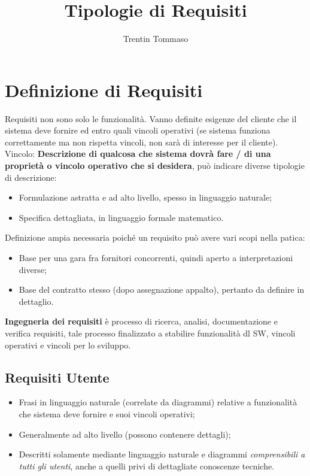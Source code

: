 \documentclass{article}
\title{Tipologie di Requisiti}
\author{Trentin Tommaso}
\begin{document}
  \maketitle
  \tableofcontents
  \newpage
  \section{Definizione di Requisiti}
    Requisiti non sono solo le funzionalità. Vanno definite esigenze del cliente che il sistema deve fornire ed entro quali vincoli operativi (se sistema funziona correttamente ma non rispetta vincoli, non sarà di interesse per il cliente). \\
    Vincolo: \textbf{Descrizione di qualcosa che sistema dovrà fare / di una proprietà o vincolo operativo che si desidera}, può indicare diverse tipologie di descrizione:
    \begin{itemize}
      \item Formulazione astratta e ad alto livello, spesso in linguaggio naturale;
      \item Specifica dettagliata, in linguaggio formale matematico.
    \end{itemize}
    Definizione ampia necessaria poiché un requisito può avere vari scopi nella patica:
    \begin{itemize}
      \item Base per una gara fra fornitori concorrenti, quindi aperto a interpretazioni diverse;
      \item Base del contratto stesso (dopo assegnazione appalto), pertanto da definire in dettaglio.
    \end{itemize}
    \textbf{Ingegneria dei requisiti} è processo di ricerca, analisi, documentazione e verifica requisiti, tale processo finalizzato a stabilire funzionalità dl SW, vincoli operativi e vincoli per lo sviluppo. 
    \subsection{Requisiti Utente}
      \begin{itemize}
        \item Frasi in linguaggio naturale (correlate da diagrammi) relative a funzionalità che sistema deve fornire e suoi vincoli operativi;
        \item Generalmente ad alto livello (possono contenere dettagli);
        \item Descritti solamente mediante linguaggio naturale e diagrammi \textit{comprensibili a tutti gli utenti}, anche a quelli privi di dettagliate conoscenze tecniche.
      \end{itemize}
\end{document}
